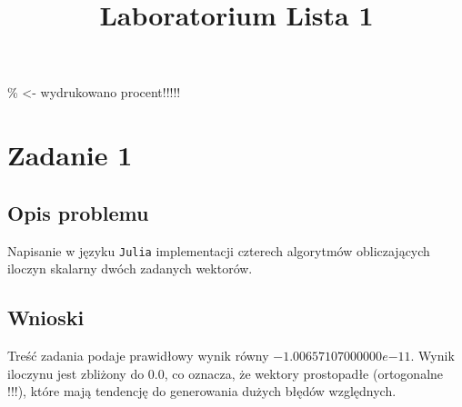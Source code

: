 \documentclass{classrep}
\author{
  \studentinfo{Agata Jasionowska}{229726}
}
\title{Laboratorium \ppauza Lista 1}
\begin{document}
\maketitle
\% <- wydrukowano procent!!!!!

\section{Zadanie 1}
	\subsection{Opis problemu}
		Napisanie w języku \texttt{Julia} implementacji czterech algorytmów obliczających iloczyn skalarny dwóch 
		zadanych wektorów.
	\subsection{Wnioski}
		Treść zadania podaje prawidłowy wynik równy $-1.00657107000000e{-11}$.
		Wynik iloczynu jest zbliżony do $0.0$, co oznacza, że wektory prostopadłe (ortogonalne !!!), które mają tendencję do generowania dużych błędów
		względnych.
\end{document}
